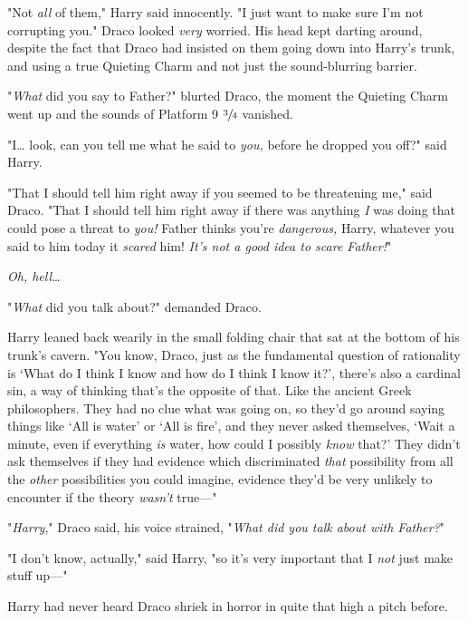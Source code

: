 "Not \emph{all} of them," Harry said innocently. "I just want to make sure I'm
not corrupting you."
\later
Draco looked \emph{very} worried. His head kept darting around, despite the
fact that Draco had insisted on them going down into Harry's trunk, and using a
true Quieting Charm and not just the sound-blurring barrier.

"\emph{What} did you say to Father?" blurted Draco, the moment the Quieting
Charm went up and the sounds of Platform 9 $\sfrac{3}{4}$ vanished.

"I{\ldots} look, can you tell me what he said to \emph{you,} before he dropped
you off?" said Harry.

"That I should tell him right away if you seemed to be threatening me," said
Draco. "That I should tell him right away if there was anything \emph{I} was
doing that could pose a threat to \emph{you!} Father thinks you're
\emph{dangerous,} Harry, whatever you said to him today it \emph{scared} him!
\emph{It's not a good idea to scare Father!}"

\emph{Oh, hell{\ldots}}

"\emph{What} did you talk about?" demanded Draco.

Harry leaned back wearily in the small folding chair that sat at the bottom of
his trunk's cavern. "You know, Draco, just as the fundamental question of
rationality is `What do I think I know and how do I think I know it?', there's
also a cardinal sin, a way of thinking that's the opposite of that. Like the
ancient Greek philosophers. They had no clue what was going on, so they'd go
around saying things like `All is water' or `All is fire', and they never asked
themselves, `Wait a minute, even if everything \emph{is} water, how could I
possibly \emph{know} that?' They didn't ask themselves if they had evidence
which discriminated \emph{that} possibility from all the \emph{other}
possibilities you could imagine, evidence they'd be very unlikely to encounter
if the theory \emph{wasn't} true---"

"\emph{Harry}," Draco said, his voice strained, "\emph{What did you talk about
with Father?}"

"I don't know, actually," said Harry, "so it's very important that I \emph{not}
just make stuff up---"

Harry had never heard Draco shriek in horror in quite that high a pitch before.
